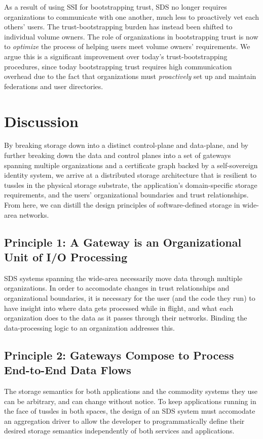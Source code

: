 As a result of using SSI for bootstrapping trust, SDS no longer requires
organizations to communicate with one another, much less to proactively vet each
others' users.  The trust-bootstrapping burden has instead been shifted to individual volume owners.
The role of organizations in bootstrapping trust is now to \emph{optimize} the
process of helping users meet volume owners' requirements.  We argue this is a
significant improvement over today's trust-bootstrapping procedures, since today
bootstrapping trust requires high communication overhead due to the fact that
organizations must \emph{proactively} set up and maintain federations and user
directories.

\section{Discussion}

By breaking storage down into a distinct control-plane and data-plane, and by
further breaking down the data and control planes into a set of gateways spanning multiple
organizations and a certificate graph backed by a self-sovereign identity system,
we arrive at a distributed storage architecture that is resilient
to tussles in the physical storage substrate, the application's
domain-specific storage requirements, and the users' organizational boundaries
and trust relationships.  From here, we can distill the design principles of
software-defined storage in wide-area networks.

\subsection{Principle 1: A Gateway is an Organizational Unit of I/O Processing}

SDS systems spanning the wide-area necessarily move data through multiple
organizations.  In order to accomodate changes in trust relationships
and organizational boundaries, it is necessary for the user (and the code they
run) to have insight into where data gets processed while in flight, and what
each organization does to the data as it passes through their networks.  Binding
the data-processing logic to an organization addresses this.

\subsection{Principle 2: Gateways Compose to Process End-to-End Data Flows}

The storage semantics for both applications and the commodity systems they use can be
arbitrary, and can change without notice.  To keep applications running in the
face of tussles in both spaces, the design of an SDS system must
accomodate an aggregation driver
to allow the developer to programmatically define
their desired storage semantics independently of both services and
applications.

